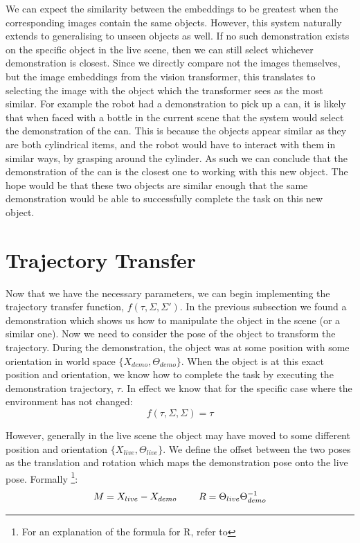 We can expect the similarity between the embeddings to be greatest when the corresponding images contain the same objects. However, this system naturally extends to generalising to unseen objects as well. If no such demonstration exists on the specific object in the live scene, then we can still select whichever demonstration is closest. Since we directly compare not the images themselves, but the image embeddings from the vision transformer, this translates to selecting the image with the object which the transformer sees as the most similar. For example the robot had a demonstration to pick up a can, it is likely that when faced with a bottle in the current scene that the system would select the demonstration of the can. This is because the objects appear similar as they are both cylindrical items, and the robot would have to interact with them in similar ways, by grasping around the cylinder. As such we can conclude that the demonstration of the can is the closest one to working with this new object. The hope would be that these two objects are similar enough that the same demonstration would be able to successfully complete the task on this new object.


\section{Trajectory Transfer}
\label{sec:alignment}
Now that we have the necessary parameters, we can begin implementing the trajectory transfer function, $f(\tau, \Sigma, \Sigma')$. In the previous subsection we found a demonstration which shows us how to manipulate the object in the scene (or a similar one). Now we need to consider the pose of the object to transform the trajectory. During the demonstration, the object was at some position with some orientation in world space $\{X_{demo}, \Theta_{demo}\}$. When the object is at this exact position and orientation, we know how to complete the task by executing the demonstration trajectory, $\tau$. In effect we know that for the specific case where the environment has not changed:
$$f(\tau, \Sigma, \Sigma) = \tau$$

However, generally in the live scene the object may have moved to some different position and orientation $\{X_{live}, \Theta_{live}\}$. We define the offset between the two poses as the translation and rotation which maps the demonstration pose onto the live pose. Formally \footnote{For an explanation of the formula for R, refer to }:
$$M = X_{live} - X_{demo} \operatorname{\operatorname{\: \: \: \:} \operatorname{\: \: \: \:}} R = \Theta_{live} \Theta_{demo}^{-1}$$ 

